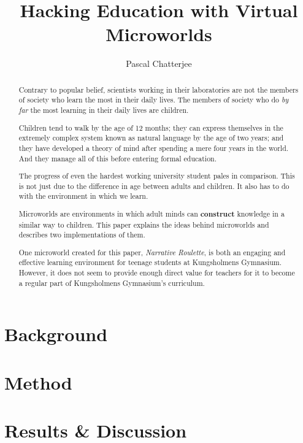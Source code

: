 \documentclass[a4paper]{report}
\title{Hacking Education with Virtual Microworlds}
\author{Pascal Chatterjee}
\date{\parbox{\linewidth}{\centering%
  \today\endgraf\bigskip
  KTH Department of Computer Science (CSC) \endgraf
  Thesis supervisor: Linda Kann}}
\begin{document}
\maketitle

\begin{abstract}
Contrary to popular belief, scientists working in their laboratories are not the members of society who learn the most in their daily lives. The members of society who do \textit{by far} the most learning in their daily lives are children. 

Children tend to walk by the age of 12 months; they can express themselves in the extremely complex system known as natural language by the age of two years; and they have developed a theory of mind after spending a mere four years in the world. And they manage all of this before entering formal education.

The progress of even the hardest working university student pales in comparison. This is not just due to the difference in age between adults and children. It also has to do with the environment in which we learn.

Microworlds are environments in which adult minds can \textbf{construct} knowledge in a similar way to children. This paper explains the ideas behind microworlds and describes two implementations of them. 

One microworld created for this paper, \textit{Narrative Roulette}, is both an engaging and effective learning environment for teenage students at Kungsholmens Gymnasium. However, it does not seem to provide enough direct value for teachers for it to become a regular part of Kungsholmens Gymnasium's curriculum.
\end{abstract}

\tableofcontents



\chapter{Background}







\chapter{Method}






\chapter{Results \& Discussion}







\end{document}
